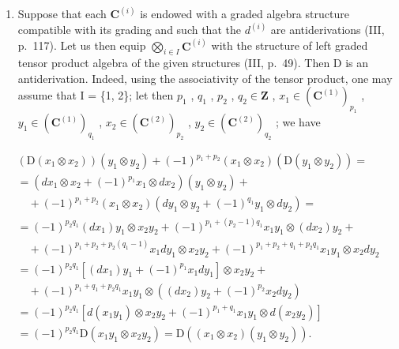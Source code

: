 \begin{enumerate}
\def\labelenumi{\arabic{enumi})}
\setcounter{enumi}{3}
\tightlist
\item
  Suppose that each \(\mathbf{C}^{(i)}\) is endowed with a graded algebra structure compatible with its grading and such that the \(d^{(i)}\) are antiderivations (III, p.~117). Let us then equip \(\bigotimes_{i\in I}\mathbf{C}^{(i)}\) with the structure of left graded tensor product algebra of the given structures (III, p.~49). Then D is an antiderivation. Indeed, using the associativity of the tensor product, one may assume that I = \{1, 2\}; let then \(p_1\) , \(q_1\) , \(p_2\) , \(q_2 \in \mathbf{Z}\) , \(x_1 \in (\mathbf{C}^{(1)})_{p_1}\) , \(y_1 \in (\mathbf{C}^{(1)})_{q_1}\) , \(x_2 \in (\mathbf{C}^{(2)})_{p_2}\) , \(y_2 \in (\mathbf{C}^{(2)})_{q_2}\) ; we have
\end{enumerate}

\[
\begin{array}{l} \left(\mathrm{D} (x _ {1} \otimes x _ {2})\right) (y _ {1} \otimes y _ {2}) + (- 1) ^ {p _ {1} + p _ {2}} (x _ {1} \otimes x _ {2}) (\mathrm{D} (y _ {1} \otimes y _ {2})) = \\ = (d x _ {1} \otimes x _ {2} + (- 1) ^ {p _ {1}} x _ {1} \otimes d x _ {2}) (y _ {1} \otimes y _ {2}) + \\ \quad + (- 1) ^ {p _ {1} + p _ {2}} (x _ {1} \otimes x _ {2}) (d y _ {1} \otimes y _ {2} + (- 1) ^ {q _ {1}} y _ {1} \otimes d y _ {2}) = \\ = (- 1) ^ {p _ {2} q _ {1}} (d x _ {1}) y _ {1} \otimes x _ {2} y _ {2} + (- 1) ^ {p _ {1} + (p _ {2} - 1) q _ {1}} x _ {1} y _ {1} \otimes (d x _ {2}) y _ {2} + \\ \quad + (- 1) ^ {p _ {1} + p _ {2} + p _ {2} (q _ {1} - 1)} x _ {1} d y _ {1} \otimes x _ {2} y _ {2} + (- 1) ^ {p _ {1} + p _ {2} + q _ {1} + p _ {2} q _ {1}} x _ {1} y _ {1} \otimes x _ {2} d y _ {2} \\ = (- 1) ^ {p _ {2} q _ {1}} [ (d x _ {1}) y _ {1} + (- 1) ^ {p _ {1}} x _ {1} d y _ {1} ] \otimes x _ {2} y _ {2} + \\ \quad + (- 1) ^ {p _ {1} + q _ {1} + p _ {2} q _ {1}} x _ {1} y _ {1} \otimes ((d x _ {2}) y _ {2} + (- 1) ^ {p _ {2}} x _ {2} d y _ {2}) \\ = (- 1) ^ {p _ {2} q _ {1}} [ d (x _ {1} y _ {1}) \otimes x _ {2} y _ {2} + (- 1) ^ {p _ {1} + q _ {1}} x _ {1} y _ {1} \otimes d (x _ {2} y _ {2}) ] \\ = (- 1) ^ {p _ {2} q _ {1}} \mathrm{D} (x _ {1} y _ {1} \otimes x _ {2} y _ {2}) = \mathrm{D} ((x _ {1} \otimes x _ {2}) (y _ {1} \otimes y _ {2}))  . \end{array}
\]

